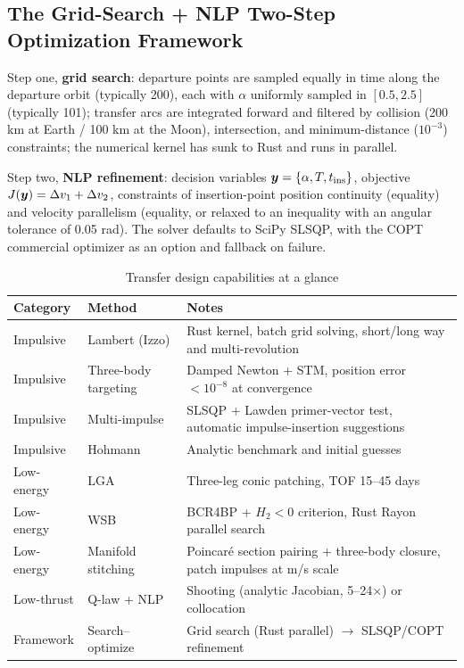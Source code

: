 \subsection{The Grid-Search + NLP Two-Step Optimization Framework}

Step one, \textbf{grid search}: departure points are sampled equally in time
along the departure orbit (typically 200), each with $\alpha$ uniformly
sampled in $[0.5, 2.5]$ (typically 101); transfer arcs are integrated forward
and filtered by collision (200 km at Earth / 100 km at the Moon),
intersection, and minimum-distance ($10^{-3}$) constraints; the numerical
kernel has sunk to Rust and runs in parallel.

Step two, \textbf{NLP refinement}: decision variables
$\bm{y} = \{\alpha, T, t_{\mathrm{ins}}\}$, objective
$J(\bm{y}) = \Delta v_1 + \Delta v_2$, constraints of insertion-point
position continuity (equality) and velocity parallelism (equality, or relaxed
to an inequality with an angular tolerance of 0.05 rad). The solver defaults
to SciPy SLSQP, with the COPT commercial optimizer as an option and fallback
on failure.

\begin{table}[htbp]
\centering\small
\caption{Transfer design capabilities at a glance}
\label{tab:transfer}
\begin{tabularx}{\textwidth}{@{}llX@{}}
\toprule
\textbf{Category} & \textbf{Method} & \textbf{Notes} \\
\midrule
Impulsive & Lambert (Izzo) & Rust kernel, batch grid solving, short/long
way and multi-revolution \\
Impulsive & Three-body targeting & Damped Newton + STM, position error
$< 10^{-8}$ at convergence \\
Impulsive & Multi-impulse & SLSQP + Lawden primer-vector test, automatic
impulse-insertion suggestions \\
Impulsive & Hohmann & Analytic benchmark and initial guesses \\
Low-energy & LGA & Three-leg conic patching, TOF 15--45 days \\
Low-energy & WSB & BCR4BP + $H_2<0$ criterion, Rust Rayon parallel search \\
Low-energy & Manifold stitching & Poincar\'e section pairing + three-body
closure, patch impulses at m/s scale \\
Low-thrust & Q-law + NLP & Shooting (analytic Jacobian, 5--24$\times$) or
collocation \\
Framework & Search--optimize & Grid search (Rust parallel) $\to$ SLSQP/COPT
refinement \\
\bottomrule
\end{tabularx}
\end{table}
